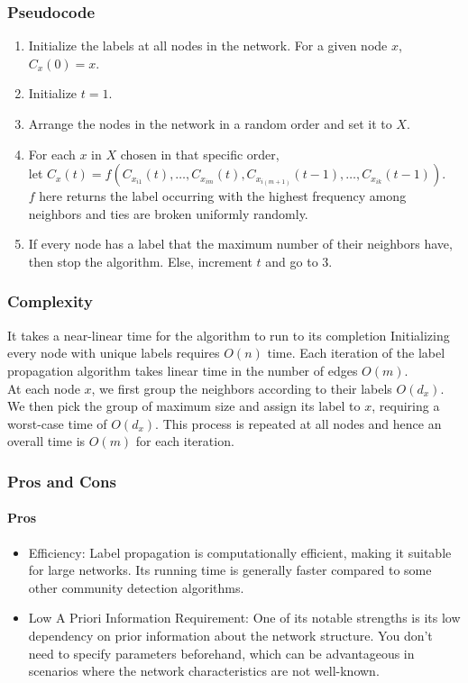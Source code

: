 \documentclass{article}
\begin{document}
\subsubsection{Pseudocode}
\begin{enumerate}
    \item Initialize the labels at all nodes in the network. For a given node $x$, $C_{x}(0) = x$.
    \item Initialize $t = 1$.
    \item Arrange the nodes in the network in a random order and set it to $X$.
    \item For each $x$ in $X$ chosen in that specific order,\\
         let $C_{x}(t) = f(C_{x_{i1}}(t),\ldots,C_{x_{im}}(t),C_{x_{i(m+1)}}(t-1),\ldots,C_{x_{ik}}(t-1))$.\\
         $f$ here returns the label occurring with the highest frequency among neighbors and ties are broken uniformly randomly.
    \item If every node has a label that the maximum number of their neighbors have, then stop the algorithm. Else, increment $t$ and go to 3.
\end{enumerate}
\subsubsection{Complexity}
It takes a near-linear time for the algorithm to run to its completion Initializing every node with unique labels requires $O(n)$ time. Each iteration of the label propagation algorithm takes linear time in the number of edges $O(m)$.\\
At each node $x$, we first group the neighbors according to their labels $O(d_{x})$. We then pick the group of maximum size and assign its label to $x$, requiring a worst-case time of $O(d_{x})$. This process is repeated at all nodes and hence an overall time is $O(m)$ for each iteration.
\subsubsection{Pros and Cons}
\paragraph{Pros}
\begin{itemize}
    \item Efficiency: Label propagation is computationally efficient, making it suitable for large networks. Its running time is generally faster compared to some other community detection algorithms.
    \item Low A Priori Information Requirement: One of its notable strengths is its low dependency on prior information about the network structure. You don't need to specify parameters beforehand, which can be advantageous in scenarios where the network characteristics are not well-known.
\end{itemize}
\end{document}
